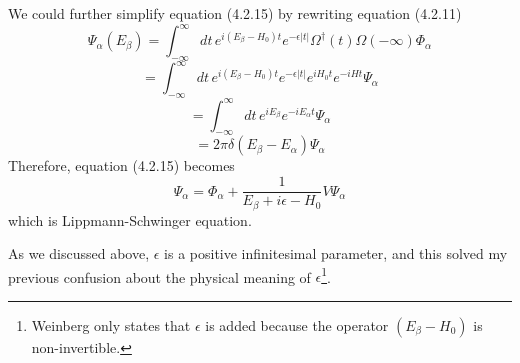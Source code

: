 \documentclass[12pt]{article}
\numberwithin{equation}{subsection}
\begin{document}
We could further simplify equation (4.2.15) by rewriting equation (4.2.11)
\[\Psi_{\alpha}(E_{\beta}) = \int_{-\infty}^{\infty}{dt\,e^{i(E_{\beta}-H_0)t}e^{-\epsilon|t|}\Omega^{\dagger}(t)\Omega(-\infty)\Phi_{\alpha}}\]
\[= \int_{-\infty}^{\infty}{dt\,e^{i(E_{\beta}-H_0)t}e^{-\epsilon|t|}e^{iH_0t}e^{-iHt}\Psi_{\alpha}}\]
\[ = \int_{-\infty}^{\infty}{dt\,e^{iE_{\beta}}e^{-iE_{\alpha}t}\Psi_{\alpha}}\]
\[ = 2\pi\delta(E_{\beta}-E_{\alpha})\Psi_{\alpha}\]
Therefore, equation (4.2.15) becomes
\begin{equation}
    \Psi_{\alpha} = \Phi_{\alpha} + \frac{1}{E_{\beta}+i\epsilon-H_0}V\Psi_{\alpha}
\end{equation}
which is Lippmann-Schwinger equation.

As we discussed above, $\epsilon$ is a positive infinitesimal parameter, and this solved my previous confusion about the physical meaning of $\epsilon$\footnote{Weinberg only states that $\epsilon$ is added because the operator $(E_{\beta}-H_0)$ is non-invertible.}.


\end{document}
